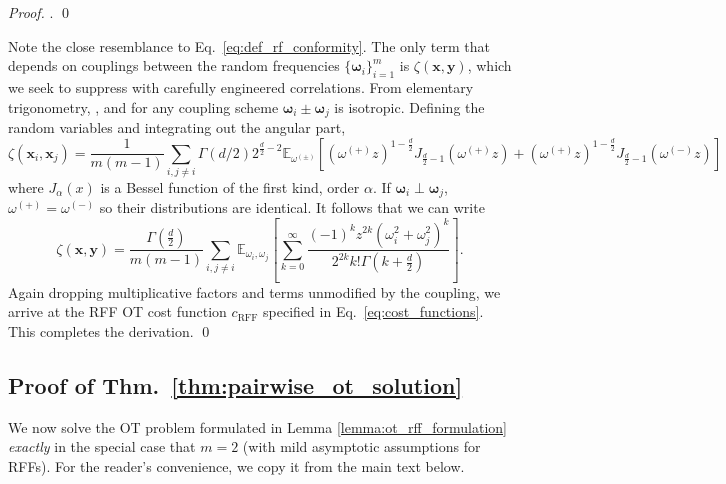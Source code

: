 \emph{Proof.} \citet{simrfs}. \qed

Note the close resemblance to Eq.~\ref{eq:def_rf_conformity}. The only term that depends on couplings between the random frequencies $\{\boldsymbol{\omega}_i\}_{i=1}^m$ is $  \zeta(\boldsymbol{x}, \boldsymbol{y})$, which we seek to suppress with carefully engineered correlations. From elementary trigonometry, , and for any coupling scheme $\boldsymbol{\omega}_i \pm \boldsymbol{\omega}_j$ is isotropic. Defining the random variables  and integrating out the angular part, 
\small
\begin{equation}
     \zeta(\boldsymbol{x}_i, \boldsymbol{x}_j) = \frac{1}{m(m-1)} \sum_{i, j\neq i}\Gamma(d/2) 2^{\frac{d}{2}-2}
     \mathbb{E}_{\omega^{(\pm)} } \left [    (\omega^{(+)}z)^{1-\frac{d}{2}} J_{\frac{d}{2}-1} (\omega^{(+)}z)  +    (\omega^{(+)}z)^{1-\frac{d}{2}} J_{\frac{d}{2}-1} (\omega^{(-)}z) \right ]
\end{equation}
\normalsize
where $J_\alpha(x)$ is a Bessel function of the first kind, order $\alpha$. 
If $\boldsymbol{\omega}_i \perp \boldsymbol{\omega}_j$, $\omega^{(+)} = \omega^{(-)}$ so their distributions are identical. 
It follows that we can write
\begin{equation}
     \zeta(\boldsymbol{x}, \boldsymbol{y}) = \frac{\Gamma(\frac{d}{2})}{m(m-1)} \sum_{i, j \neq i}\mathbb{E}_{\omega_i, \omega_j}\left [ \sum_{k=0}^\infty \frac{(-1)^k z^{2k}  \left( \omega_i^2 + \omega_j^2 \right)^k}{2^{2k} k! \Gamma(k+\frac{d}{2})}\right ].
\end{equation}
Again dropping multiplicative factors and terms unmodified by the coupling, we arrive at the RFF OT cost function $c_\textrm{RFF}$ specified in Eq.~\ref{eq:cost_functions}.
This completes the derivation. \qed

\subsection{Proof of Thm.~\ref{thm:pairwise_ot_solution}} \label{app:main_thm_rff_proof}
We now solve the OT problem formulated in Lemma \ref{lemma:ot_rff_formulation} \emph{exactly} in the special case that $m=2$ (with mild asymptotic assumptions for RFFs).
For the reader's convenience, we copy it from the main text below.

